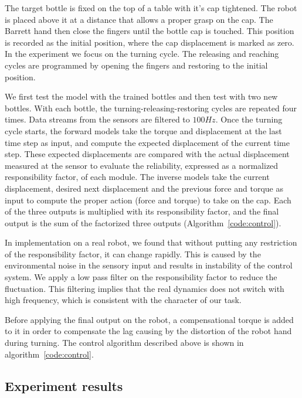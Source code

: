 The target bottle is fixed on the top of a table with it's cap tightened. The robot is placed above it at a distance that allows a proper grasp on the cap. The Barrett hand then close the fingers until the bottle cap is touched. This position is recorded as the initial position, where the cap displacement is marked as zero. In the experiment we focus on the turning cycle. The releasing and reaching cycles are programmed by opening the fingers and restoring to the initial position.

We first test the model with the trained bottles and then test with two new bottles. With each bottle, the turning-releasing-restoring cycles are repeated four times. Data streams from the sensors are filtered to $100Hz$. Once the turning cycle starts, the forward models take the torque and displacement at the last time step as input, and compute the expected displacement of the current time step. These expected displacements are compared with the actual displacement measured at the sensor to evaluate the reliability, expressed as a normalized responsibility factor, of each module. The inverse models take the current displacement, desired next displacement and the previous force and torque as input to compute the proper action (force and torque) to take on the cap. Each of the three outputs is multiplied with its responsibility factor, and the final output is the sum of the factorized three outputs (Algorithm~\ref{code:control}).

In implementation on a real robot, we found that without putting any restriction of the responsibility factor, it can change rapidly. This is caused by the environmental noise in the sensory input and results in instability of the control system. We apply a low pass filter on the responsibility factor to reduce the fluctuation. This filtering implies that the real dynamics does not switch with high frequency, which is consistent with the character of our task.


Before applying the final output on the robot, a compensational torque is added to it in order to compensate the lag causing by the distortion of the robot hand during turning. The control algorithm described above is shown in algorithm~\ref{code:control}.



\subsection{Experiment results}
\label{cha4:sec3:result}

